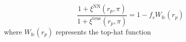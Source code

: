                                                                                                                                                                                                                                                                           \begin{equation} \label{eq:tophat_2pcf}
                                                                                                                                                                                                                                                                          \frac{1 + \xi^\mathrm{NN}(r_p, \pi)}{1 + \xi^\mathrm{true}(r_p, \pi)} =1 -  f_s W_\mathrm{fc}(r_p)
                                                                                                                                                                                                                                                                          \end{equation}
                                                                                                                                                                                                                                                                          where $W_\mathrm{fc}(r_p)$ represents the top-hat function

